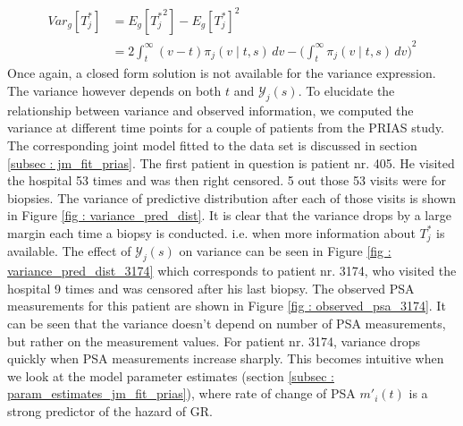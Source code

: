 \begin{equation}
\begin{split}
Var_g[T^*_j] &= E_g[{T^*_j}^2] - {E_g[T^*_j]}^2\\
&= 2 \int_t^\infty {(v-t) \pi_j(v \mid t, s) \,dv} - {\bigg(\int_t^\infty \pi_j(v \mid t, s) \,dv\bigg)}^2
\end{split}
\end{equation}
Once again, a closed form solution is not available for the variance expression. The variance however depends on both $t$ and $\mathcal{Y}_j(s)$. To elucidate the relationship between variance and observed information, we computed the variance at different time points for a couple of patients from the PRIAS study. The corresponding joint model fitted to the data set is discussed in section \ref{subsec : jm_fit_prias}. The first patient in question is patient nr. 405. He visited the hospital 53 times and was then right censored. 5 out those 53 visits were for biopsies. The variance of predictive distribution after each of those visits is shown in Figure \ref{fig : variance_pred_dist}. It is clear that the variance drops by a large margin each time a biopsy is conducted. i.e. when more information about $T^*_j$ is available. The effect of $\mathcal{Y}_j(s)$ on variance can be seen in Figure \ref{fig : variance_pred_dist_3174} which corresponds to patient nr. 3174, who visited the hospital 9 times and was censored after his last biopsy. The observed PSA measurements for this patient are shown in Figure \ref{fig : observed_psa_3174}. It can be seen that the variance doesn't depend on number of PSA measurements, but rather on the measurement values. For patient nr. 3174, variance drops quickly when PSA measurements increase sharply.  This becomes intuitive when we look at the model parameter estimates (section \ref{subsec : param_estimates_jm_fit_prias}), where rate of change of PSA $m'_i(t)$ is a strong predictor of the hazard of GR.

